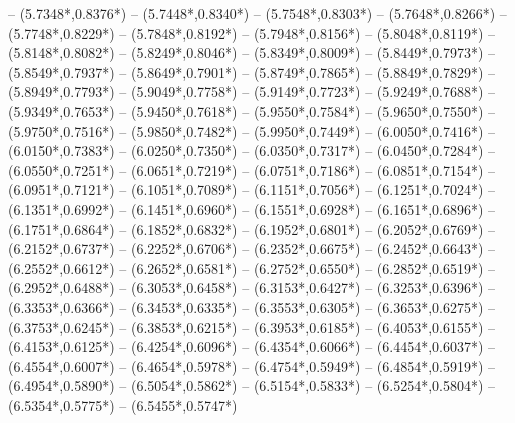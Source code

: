 {	-- ({5.7348*\dx},{0.8376*\dy})
	-- ({5.7448*\dx},{0.8340*\dy})
	-- ({5.7548*\dx},{0.8303*\dy})
	-- ({5.7648*\dx},{0.8266*\dy})
	-- ({5.7748*\dx},{0.8229*\dy})
	-- ({5.7848*\dx},{0.8192*\dy})
	-- ({5.7948*\dx},{0.8156*\dy})
	-- ({5.8048*\dx},{0.8119*\dy})
	-- ({5.8148*\dx},{0.8082*\dy})
	-- ({5.8249*\dx},{0.8046*\dy})
	-- ({5.8349*\dx},{0.8009*\dy})
	-- ({5.8449*\dx},{0.7973*\dy})
	-- ({5.8549*\dx},{0.7937*\dy})
	-- ({5.8649*\dx},{0.7901*\dy})
	-- ({5.8749*\dx},{0.7865*\dy})
	-- ({5.8849*\dx},{0.7829*\dy})
	-- ({5.8949*\dx},{0.7793*\dy})
	-- ({5.9049*\dx},{0.7758*\dy})
	-- ({5.9149*\dx},{0.7723*\dy})
	-- ({5.9249*\dx},{0.7688*\dy})
	-- ({5.9349*\dx},{0.7653*\dy})
	-- ({5.9450*\dx},{0.7618*\dy})
	-- ({5.9550*\dx},{0.7584*\dy})
	-- ({5.9650*\dx},{0.7550*\dy})
	-- ({5.9750*\dx},{0.7516*\dy})
	-- ({5.9850*\dx},{0.7482*\dy})
	-- ({5.9950*\dx},{0.7449*\dy})
	-- ({6.0050*\dx},{0.7416*\dy})
	-- ({6.0150*\dx},{0.7383*\dy})
	-- ({6.0250*\dx},{0.7350*\dy})
	-- ({6.0350*\dx},{0.7317*\dy})
	-- ({6.0450*\dx},{0.7284*\dy})
	-- ({6.0550*\dx},{0.7251*\dy})
	-- ({6.0651*\dx},{0.7219*\dy})
	-- ({6.0751*\dx},{0.7186*\dy})
	-- ({6.0851*\dx},{0.7154*\dy})
	-- ({6.0951*\dx},{0.7121*\dy})
	-- ({6.1051*\dx},{0.7089*\dy})
	-- ({6.1151*\dx},{0.7056*\dy})
	-- ({6.1251*\dx},{0.7024*\dy})
	-- ({6.1351*\dx},{0.6992*\dy})
	-- ({6.1451*\dx},{0.6960*\dy})
	-- ({6.1551*\dx},{0.6928*\dy})
	-- ({6.1651*\dx},{0.6896*\dy})
	-- ({6.1751*\dx},{0.6864*\dy})
	-- ({6.1852*\dx},{0.6832*\dy})
	-- ({6.1952*\dx},{0.6801*\dy})
	-- ({6.2052*\dx},{0.6769*\dy})
	-- ({6.2152*\dx},{0.6737*\dy})
	-- ({6.2252*\dx},{0.6706*\dy})
	-- ({6.2352*\dx},{0.6675*\dy})
	-- ({6.2452*\dx},{0.6643*\dy})
	-- ({6.2552*\dx},{0.6612*\dy})
	-- ({6.2652*\dx},{0.6581*\dy})
	-- ({6.2752*\dx},{0.6550*\dy})
	-- ({6.2852*\dx},{0.6519*\dy})
	-- ({6.2952*\dx},{0.6488*\dy})
	-- ({6.3053*\dx},{0.6458*\dy})
	-- ({6.3153*\dx},{0.6427*\dy})
	-- ({6.3253*\dx},{0.6396*\dy})
	-- ({6.3353*\dx},{0.6366*\dy})
	-- ({6.3453*\dx},{0.6335*\dy})
	-- ({6.3553*\dx},{0.6305*\dy})
	-- ({6.3653*\dx},{0.6275*\dy})
	-- ({6.3753*\dx},{0.6245*\dy})
	-- ({6.3853*\dx},{0.6215*\dy})
	-- ({6.3953*\dx},{0.6185*\dy})
	-- ({6.4053*\dx},{0.6155*\dy})
	-- ({6.4153*\dx},{0.6125*\dy})
	-- ({6.4254*\dx},{0.6096*\dy})
	-- ({6.4354*\dx},{0.6066*\dy})
	-- ({6.4454*\dx},{0.6037*\dy})
	-- ({6.4554*\dx},{0.6007*\dy})
	-- ({6.4654*\dx},{0.5978*\dy})
	-- ({6.4754*\dx},{0.5949*\dy})
	-- ({6.4854*\dx},{0.5919*\dy})
	-- ({6.4954*\dx},{0.5890*\dy})
	-- ({6.5054*\dx},{0.5862*\dy})
	-- ({6.5154*\dx},{0.5833*\dy})
	-- ({6.5254*\dx},{0.5804*\dy})
	-- ({6.5354*\dx},{0.5775*\dy})
	-- ({6.5455*\dx},{0.5747*\dy})
}
